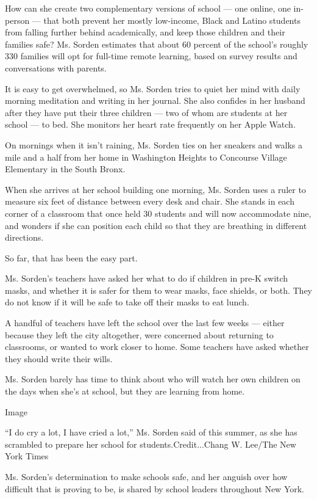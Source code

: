 How can she create two complementary versions of school --- one online,
one in-person --- that both prevent her mostly low-income, Black and
Latino students from falling further behind academically, and keep those
children and their families safe? Ms. Sorden estimates that about 60
percent of the school's roughly 330 families will opt for full-time
remote learning, based on survey results and conversations with parents.

It is easy to get overwhelmed, so Ms. Sorden tries to quiet her mind
with daily morning meditation and writing in her journal. She also
confides in her husband after they have put their three children --- two
of whom are students at her school --- to bed. She monitors her heart
rate frequently on her Apple Watch.

On mornings when it isn't raining, Ms. Sorden ties on her sneakers and
walks a mile and a half from her home in Washington Heights to Concourse
Village Elementary in the South Bronx.

When she arrives at her school building one morning, Ms. Sorden uses a
ruler to measure six feet of distance between every desk and chair. She
stands in each corner of a classroom that once held 30 students and will
now accommodate nine, and wonders if she can position each child so that
they are breathing in different directions.

So far, that has been the easy part.

Ms. Sorden's teachers have asked her what to do if children in pre-K
switch masks, and whether it is safer for them to wear masks, face
shields, or both. They do not know if it will be safe to take off their
masks to eat lunch.

A handful of teachers have left the school over the last few weeks ---
either because they left the city altogether, were concerned about
returning to classrooms, or wanted to work closer to home. Some teachers
have asked whether they should write their wills.

Ms. Sorden barely has time to think about who will watch her own
children on the days when she's at school, but they are learning from
home.

Image

``I do cry a lot, I have cried a lot,'' Ms. Sorden said of this summer,
as she has scrambled to prepare her school for students.Credit...Chang
W. Lee/The New York Times

Ms. Sorden's determination to make schools safe, and her anguish over
how difficult that is proving to be, is shared by school leaders
throughout New York.

